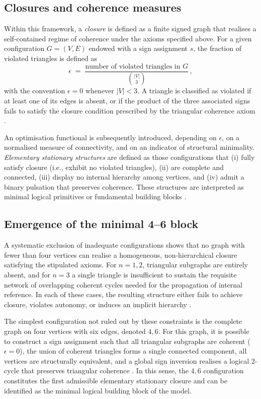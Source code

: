 \documentclass[11pt,a4paper]{article}
\begin{document}
\subsection{Closures and coherence measures}
\label{subsec:closures}

Within this framework, a \emph{closure} is defined as a finite signed graph that realises a self-contained regime of coherence under the axioms specified above. For a given configuration \(G = (V, E)\) endowed with a sign assignment \(s\), the fraction of violated triangles is defined as
\[
  \epsilon \;=\; \frac{\text{number of violated triangles in } G}{\binom{|V|}{3}} \, ,
\]
with the convention \(\epsilon = 0\) whenever \(|V| < 3\). A triangle is classified as violated if at least one of its edges is absent, or if the product of the three associated signs fails to satisfy the closure condition prescribed by the triangular coherence axiom \citep{PDL_Main_2026}.

An optimisation functional is subsequently introduced, depending on \(\epsilon\), on a normalised measure of connectivity, and on an indicator of structural minimality. \emph{Elementary stationary structures} are defined as those configurations that (i) fully satisfy closure (i.e., exhibit no violated triangles), (ii) are complete and connected, (iii) display no internal hierarchy among vertices, and (iv) admit a binary pulsation that preserves coherence. These structures are interpreted as minimal logical primitives or fundamental building blocks \citep{PDL_Main_2026,PDL_position}.

\subsection{Emergence of the minimal 4--6 block}
\label{subsec:4_6_block}

A systematic exclusion of inadequate configurations shows that no graph with fewer than four vertices can realise a homogeneous, non-hierarchical closure satisfying the stipulated axioms. For \(n = 1,2\), triangular subgraphs are entirely absent, and for \(n = 3\) a single triangle is insufficient to sustain the requisite network of overlapping coherent cycles needed for the propagation of internal reference. In each of these cases, the resulting structure either fails to achieve closure, violates autonomy, or induces an implicit hierarchy \citep{PDL_Main_2026}.

The simplest configuration not ruled out by these constraints is the complete graph on four vertices with six edges, denoted \(4,6\). For this graph, it is possible to construct a sign assignment such that all triangular subgraphs are coherent (\(\epsilon = 0\)), the union of coherent triangles forms a single connected component, all vertices are structurally equivalent, and a global sign inversion realises a logical 2-cycle that preserves triangular coherence
\citep{PDL_Main_2026,PDL_intro}. In this sense, the \(4,6\) configuration constitutes the first admissible elementary stationary closure and can be identified as the minimal logical building block of the model.
\end{document}
